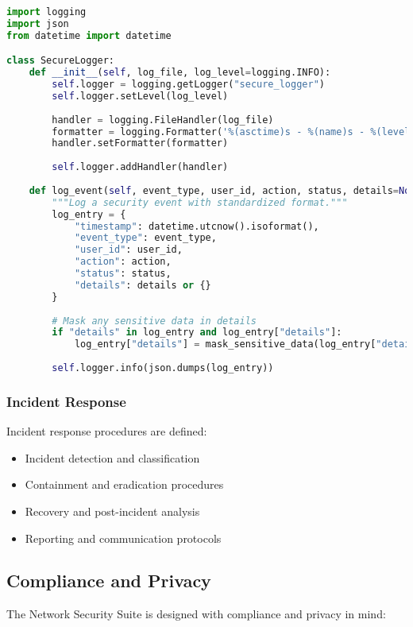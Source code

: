 \begin{lstlisting}[language=python, caption=Secure Logging Example]
import logging
import json
from datetime import datetime

class SecureLogger:
    def __init__(self, log_file, log_level=logging.INFO):
        self.logger = logging.getLogger("secure_logger")
        self.logger.setLevel(log_level)
        
        handler = logging.FileHandler(log_file)
        formatter = logging.Formatter('%(asctime)s - %(name)s - %(levelname)s - %(message)s')
        handler.setFormatter(formatter)
        
        self.logger.addHandler(handler)
        
    def log_event(self, event_type, user_id, action, status, details=None):
        """Log a security event with standardized format."""
        log_entry = {
            "timestamp": datetime.utcnow().isoformat(),
            "event_type": event_type,
            "user_id": user_id,
            "action": action,
            "status": status,
            "details": details or {}
        }
        
        # Mask any sensitive data in details
        if "details" in log_entry and log_entry["details"]:
            log_entry["details"] = mask_sensitive_data(log_entry["details"])
            
        self.logger.info(json.dumps(log_entry))
\end{lstlisting}

\subsubsection{Incident Response}
Incident response procedures are defined:

\begin{itemize}
    \item Incident detection and classification
    \item Containment and eradication procedures
    \item Recovery and post-incident analysis
    \item Reporting and communication protocols
\end{itemize}

\subsection{Compliance and Privacy}
The Network Security Suite is designed with compliance and privacy in mind:

